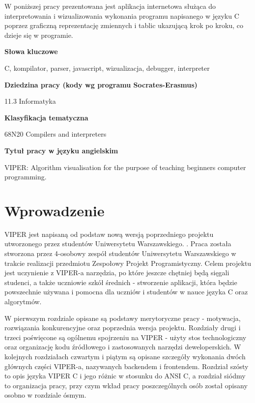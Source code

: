 \documentclass[a4paper,twoside,openright,11pt]{report}
\begin{document}
  \begin{titlepage}
  \null\nobreak\vfil
  \begin{center}%
    \bfseries\large \abstractname
  \end{center}
W poniższej pracy prezentowana jest aplikacja internetowa służąca do interpretowania i wizualizowania wykonania programu napisanego w języku C poprzez graficzną reprezentację zmiennych i tablic ukazującą krok po kroku, co dzieje się w programie.  \vspace*{26pt}%
  \begin{center}%
    \bfseries\large Słowa kluczowe
  \end{center}
  C, kompilator, parser, javascript, wizualizacja, debugger, interpreter
  \vspace*{26pt}%
  \begin{center}%
    \bfseries\large Dziedzina pracy (kody wg programu Socrates-Erasmus)
  \end{center}
   11.3 Informatyka
  \vspace*{26pt}%
  \begin{center}%
    \bfseries\large Klasyfikacja tematyczna
  \end{center}
   68N20 Compilers and interpreters
  \vspace*{26pt}%
  \begin{center}%
    \bfseries\large Tytuł pracy w języku angielskim
  \end{center}
  VIPER: Algorithm visualisation for the purpose of teaching beginners computer programming.
  \nobreak\vfil\null\cleardoublepage
  \end{titlepage}

  \tableofcontents

  \chapter{Wprowadzenie}
\par VIPER jest napisaną od podstaw nową wersją poprzedniego projektu utworzonego przez studentów Uniwersytetu Warszawskiego. \cite{viper1}. Praca została stworzona przez 4-osobowy zespół studentów Uniwersytetu Warszawskiego w trakcie realizacji przedmiotu Zespołowy Projekt Programistyczny. Celem projektu jest uczynienie z VIPER-a narzędzia, po które jeszcze chętniej będą sięgali studenci, a także uczniowie szkół średnich - stworzenie aplikacji, która będzie powszechnie używana i pomocna dla uczniów i studentów w nauce języka C oraz algorytmów. 
\par W pierwszym rozdziale opisane są podstawy merytoryczne pracy - motywacja, rozwiązania konkurencyjne oraz poprzednia wersja projektu. Rozdziały drugi i trzeci poświęcone są ogólnemu spojrzeniu na VIPER - użyty stos technologiczny oraz organizację kodu źródłowego i zastosowanych narzędzi deweloperskich. W kolejnych rozdziałach czwartym i piątym są opisane szczegóły wykonania dwóch głównych części VIPER-a, nazywanych backendem i frontendem. Rozdział szósty to opis języka VIPER C i jego różnic w stosunku do ANSI C, a rozdział siódmy to organizacja pracy, przy czym wkład pracy poszczególnych osób został opisany osobno w rozdziale ósmym.
\end{document}
